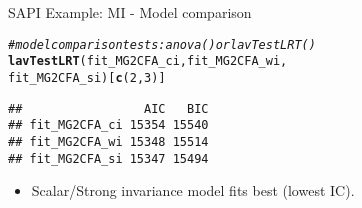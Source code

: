 \documentclass[10pt]{beamer}\usepackage[]{graphicx}\usepackage[]{xcolor}
\makeatletter
\newcommand{\hlnum}[1]{\textcolor[rgb]{0.686,0.059,0.569}{#1}}%
\newcommand{\hlcom}[1]{\textcolor[rgb]{0.678,0.584,0.686}{\textit{#1}}}%
\newcommand{\hldef}[1]{\textcolor[rgb]{0.345,0.345,0.345}{#1}}%
\newcommand{\hlkwd}[1]{\textcolor[rgb]{0.737,0.353,0.396}{\textbf{#1}}}%
\newenvironment{kframe}{%
 \def\at@end@of@kframe{}%
 \ifinner\ifhmode%
  \def\at@end@of@kframe{\end{minipage}}%
  \begin{minipage}{\columnwidth}%
 \fi\fi%
 \def\FrameCommand##1{\hskip\@totalleftmargin \hskip-\fboxsep
 \colorbox{shadecolor}{##1}\hskip-\fboxsep
     \hskip-\linewidth \hskip-\@totalleftmargin \hskip\columnwidth}%
 \MakeFramed {\advance\hsize-\width
   \@totalleftmargin\z@ \linewidth\hsize
   \@setminipage}}%
 {\par\unskip\endMakeFramed%
 \at@end@of@kframe}
\newenvironment{knitrout}{}{} %
\makeatother
\begin{document}
%
\begin{frame}[fragile]{SAPI Example: MI - Model comparison}

\begin{knitrout}
\color{fgcolor}\begin{kframe}
\begin{alltt}
\hlcom{# model comparison tests: anova() or lavTestLRT()}
\hlkwd{lavTestLRT}\hldef{(fit_MG2CFA_ci, fit_MG2CFA_wi,}
           \hldef{fit_MG2CFA_si)[}\hlkwd{c}\hldef{(}\hlnum{2}\hldef{,}\hlnum{3}\hldef{)]}
\end{alltt}
\begin{verbatim}
##                 AIC   BIC
## fit_MG2CFA_ci 15354 15540
## fit_MG2CFA_wi 15348 15514
## fit_MG2CFA_si 15347 15494
\end{verbatim}
\end{kframe}
\end{knitrout}

\begin{itemize}
    \item Scalar/Strong invariance model fits best (lowest IC).
\end{itemize}

\end{frame}
%
\end{document}

